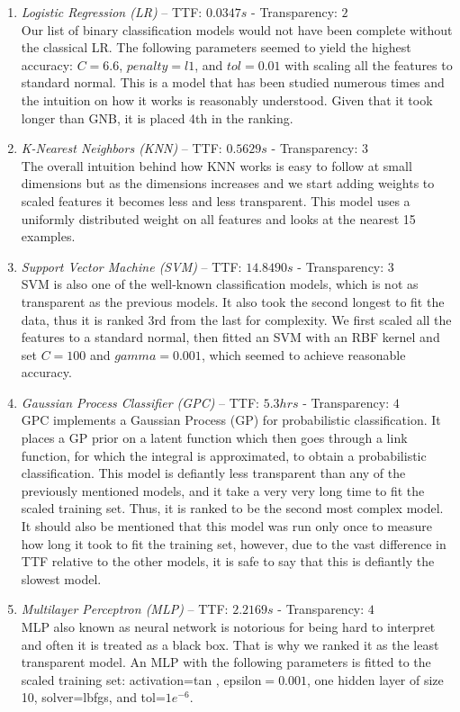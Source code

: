 \begin{enumerate}
\item \textit{Logistic Regression (LR)} -- TTF: $0.0347 s$ - Transparency: $2$ \\
Our list of binary classification models would not have been complete without the classical LR. The following parameters seemed to yield the highest accuracy: $C=6.6$, $penalty= l1$, and $tol=0.01$ with scaling all the features to standard normal. This is a model that has been studied numerous times and the intuition on how it works is reasonably understood. Given that it took longer than GNB, it is placed 4th in the ranking.

\item \textit{K-Nearest Neighbors (KNN)} -- TTF: $0.5629 s$ - Transparency: $3$ \\
The overall intuition behind how KNN works is easy to follow at small dimensions but as the dimensions increases and we start adding weights to scaled features it becomes less and less transparent. This model uses a uniformly distributed weight on all features and looks at the nearest 15 examples. 

\item \textit{Support Vector Machine (SVM)} -- TTF: $14.8490 s$ - Transparency: $3$ \\
SVM is also one of the well-known classification models, which is not as transparent as the previous models. It also took the second longest to fit the data, thus it is ranked 3rd from the last for complexity. We first scaled all the features to a standard normal, then fitted an SVM with an RBF kernel and set $C=100$ and $gamma=0.001$, which seemed to achieve reasonable accuracy.

\item \textit{Gaussian Process Classifier (GPC)} -- TTF: $5.3hrs$ - Transparency: $4$ \\
GPC implements a Gaussian Process (GP) for probabilistic classification. It places a GP prior on a latent function which then goes through a link function, for which the integral is approximated, to obtain a probabilistic classification. This model is defiantly less transparent than any of the previously mentioned models, and it take a very very long time to fit the scaled training set. Thus, it is ranked to be the second most complex model. It should also be mentioned that this model was run only once to measure how long it took to fit the training set, however, due to the vast difference in TTF relative to the other models, it is safe to say that this is defiantly the slowest model.

\item \textit{Multilayer Perceptron (MLP)} -- TTF: $2.2169 s$ - Transparency: $4$ \\
MLP also known as neural network is notorious for being hard to interpret and often it is treated as a black box. That is why we ranked it as the least transparent model. An MLP with the following parameters is fitted to the scaled training set: activation=tan , epsilon$=0.001$, one hidden layer of size 10, solver=lbfgs, and tol=$1e^{-6}$.
\end{enumerate}


